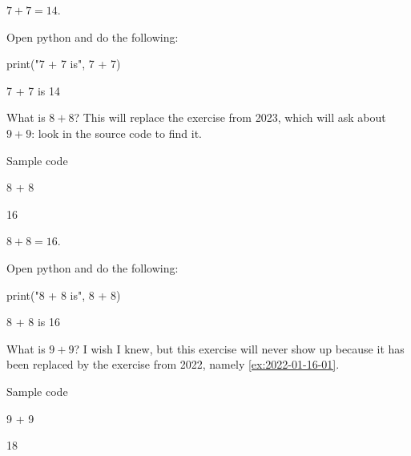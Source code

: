 \documentclass{book}
\begin{document}
\begin{solution}
  \(7 + 7 = 14\).
\end{solution}

\begin{additionalinformation}
Open python and do the following:

\begin{pycell}
print("7 + 7 is", 7 + 7)
\end{pycell}
\begin{pyexpectedoutput}
7 + 7 is 14
\end{pyexpectedoutput}
\end{additionalinformation}

\begin{exercise}[examdate={January 16, 2022}, examproblemnumber={1}, examproblemid={2022-01-16-01}]
  What is \(8 + 8\)? This will replace the exercise from 2023, which will ask about \(9 + 9\): look in the source code to find it.

Sample code
\begin{pycell}
8 + 8
\end{pycell}
\begin{pyexpectedoutput}
16
\end{pyexpectedoutput}
\end{exercise}

\begin{solution}
  \(8 + 8 = 16\).
\end{solution}

\begin{additionalinformation}
Open python and do the following:

\begin{pycell}
print("8 + 8 is", 8 + 8)
\end{pycell}
\begin{pyexpectedoutput}
8 + 8 is 16
\end{pyexpectedoutput}
\end{additionalinformation}

\begin{exercise}[examdate={January 16, 2023}, examproblemnumber={1}, examproblemid={2023-01-16-01}, replacedbyexamproblemid={2022-01-16-01}, replacementsinceacademicyear={2025/2026}]
  What is \(9 + 9\)? I wish I knew, but this exercise will never show up because it has been replaced by the exercise from 2022, namely \cref{ex:2022-01-16-01}.

Sample code
\begin{pycell}
9 + 9
\end{pycell}
\begin{pyexpectedoutput}
18
\end{pyexpectedoutput}
\end{exercise}
\end{document}
